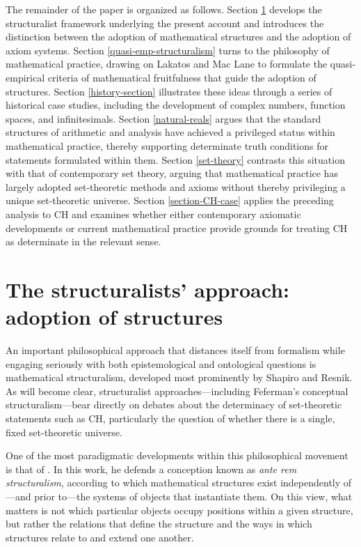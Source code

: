 \documentclass[11pt,a4paper]{book}
\theoremstyle{plain}
\begin{document}
The remainder of the paper is organized as follows. Section \ref{structuralims-ontology-epistemology} develops the structuralist framework underlying the present account and introduces the distinction between the adoption of mathematical structures and the adoption of axiom systems. Section \ref{quasi-emp-structuralism} turns to the philosophy of mathematical practice, drawing on Lakatos and Mac Lane to formulate the quasi-empirical criteria of mathematical fruitfulness that guide the adoption of structures. Section \ref{history-section} illustrates these ideas through a series of historical case studies, including the development of complex numbers, function spaces, and infinitesimals. Section \ref{natural-reals} argues that the standard structures of arithmetic and analysis have achieved a privileged status within mathematical practice, thereby supporting determinate truth conditions for statements formulated within them. Section \ref{set-theory} contrasts this situation with that of contemporary set theory, arguing that mathematical practice has largely adopted set-theoretic methods and axioms without thereby privileging a unique set-theoretic universe. Section \ref{section-CH-case} applies the preceding analysis to $\mathrm{CH}$ and examines whether either contemporary axiomatic developments or current mathematical practice provide grounds for treating $\mathrm{CH}$ as determinate in the relevant sense.

\section{The structuralists' approach: adoption of structures}
\label{structuralims-ontology-epistemology}
 
An important philosophical approach that distances itself from formalism while engaging seriously with both epistemological and ontological questions is mathematical structuralism, developed most prominently by Shapiro and Resnik. As will become clear, structuralist approaches---including Feferman's conceptual structuralism---bear directly on debates about the determinacy of set-theoretic statements such as CH, particularly the question of whether there is a single, fixed set-theoretic universe.

One of the most paradigmatic developments within this philosophical movement is that of \textcite{Shapiro1997}. In this work, he defends a conception known as \textit{ante rem structuralism}, according to which mathematical structures exist independently of—and prior to—the systems of objects that instantiate them. On this view, what matters is not which particular objects occupy positions within a given structure, but rather the relations that define the structure and the ways in which structures relate to and extend one another.
\end{document}
